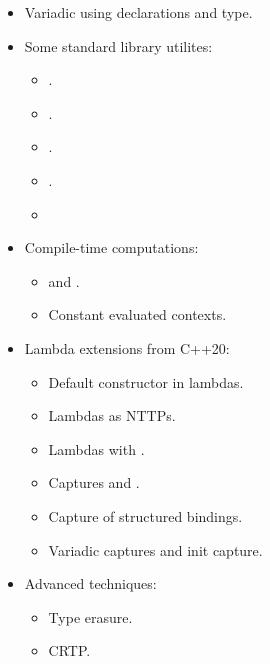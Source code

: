 \begin{itemize}
  \item Variadic using declarations and  type.
  \item Some standard library utilites:
    \begin{itemize}
      \item {}.
      \item {}.
      \item {}.
      \item {}.
      \item {}
    \end{itemize}
  \item Compile-time computations:
    \begin{itemize}
      \item {} and .
      \item Constant evaluated contexts.
    \end{itemize}
  \item Lambda extensions from C++20:
    \begin{itemize}
      \item Default constructor in lambdas.
      \item Lambdas as NTTPs.
      \item Lambdas with .
      \item Captures \cppkey{[=,this]} and \cppkey{[*this]}.
      \item Capture of structured bindings.
      \item Variadic captures and init capture.
    \end{itemize}
  \item Advanced techniques:
    \begin{itemize}
      \item Type erasure.
      \item CRTP.
    \end{itemize}
\end{itemize}
